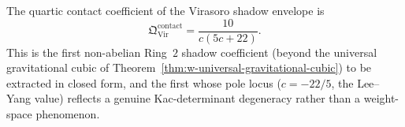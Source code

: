 \begin{theorem}
\label{thm:w-virasoro-quartic-explicit}
The quartic contact coefficient of the Virasoro shadow envelope is
\begin{equation}
\label{eq:w-virasoro-quartic-explicit}
\mathfrak Q^{\mathrm{contact}}_{\mathrm{Vir}}
= \frac{10}{c(5c+22)}.
\end{equation}
This is the first non-abelian Ring~$2$ shadow coefficient
(beyond the universal gravitational cubic of
Theorem~\ref{thm:w-universal-gravitational-cubic}) to be
extracted in closed form, and the first whose pole locus
($c = -22/5$, the Lee--Yang value) reflects a genuine
Kac-determinant degeneracy rather than a weight-space
phenomenon.
\end{theorem}

